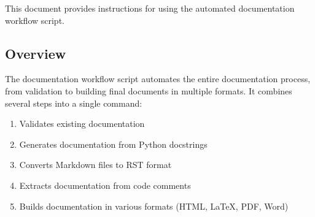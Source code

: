 \documentclass[letterpaper,10pt,english]{sphinxmanual}
\begin{document}
\sphinxAtStartPar
This document provides instructions for using the automated documentation workflow script.


\subsection{Overview}
\label{\detokenize{documentation_workflow:overview}}
\sphinxAtStartPar
The documentation workflow script automates the entire documentation process, from validation to building final documents in multiple formats. It combines several steps into a single command:
\begin{enumerate}
%
\item {} 
\sphinxAtStartPar
Validates existing documentation

\item {} 
\sphinxAtStartPar
Generates documentation from Python docstrings

\item {} 
\sphinxAtStartPar
Converts Markdown files to RST format

\item {} 
\sphinxAtStartPar
Extracts documentation from code comments

\item {} 
\sphinxAtStartPar
Builds documentation in various formats (HTML, LaTeX, PDF, Word)

\end{enumerate}
\end{document}
